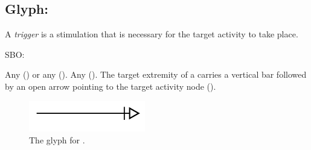 \subsection{Glyph: }
\label{sec:af:trigger}

A \emph{trigger} is a stimulation that is necessary for the target activity to take place. 

\begin{glyphDescription}

\glyphSboTerm SBO:

 \glyphOrigin Any  () or any  ().
 \glyphTarget Any  ().
 \glyphEndPoint The target extremity of a  carries a vertical bar followed by an open arrow pointing to the target activity node ().


\end{glyphDescription}

\begin{figure}[H]
  \centering
  \includegraphics[width = 2in]{images/trigger}
  \caption{The \AF glyph for .}
  \label{fig:af:trigger}
\end{figure}
